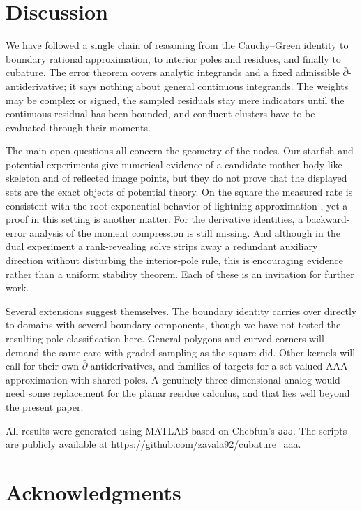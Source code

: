 \documentclass[onefignum,onetabnum]{siamart220329}
\begin{document}
\section{Discussion}
\label{sec:discussion}

We have followed a single chain of reasoning from the Cauchy--Green
identity to boundary rational approximation, to interior poles and
residues, and finally to cubature. The error theorem covers analytic
integrands and a fixed admissible $\bar\partial$-antiderivative; it says
nothing about general continuous integrands. The weights may be complex
or signed, the sampled residuals stay mere indicators until the
continuous residual has been bounded, and confluent clusters have to be
evaluated through their moments.

The main open questions all concern the geometry of the nodes. Our
starfish and potential experiments give numerical evidence of a
candidate mother-body-like skeleton and of reflected image points, but
they do not prove that the displayed sets are the exact objects of
potential theory. On the square the measured rate is consistent with
the root-exponential behavior of lightning approximation
\cite{GopalTrefethen2019}, yet a proof in this setting is another
matter. For the derivative identities, a backward-error analysis of the
moment compression is still missing. And although in the dual
experiment a rank-revealing solve strips away a redundant auxiliary
direction without disturbing the interior-pole rule, this is encouraging
evidence rather than a uniform stability theorem. Each of these is an
invitation for further work.

Several extensions suggest themselves. The boundary identity carries
over directly to domains with several boundary components, though we
have not tested the resulting pole classification here. General
polygons and curved corners will demand the same care with graded
sampling as the square did. Other kernels will call for their own
$\bar\partial$-antiderivatives, and families of targets for a
set-valued AAA approximation with shared poles. A genuinely
three-dimensional analog would need some replacement for the planar
residue calculus, and that lies well beyond the present paper.

All results were generated using MATLAB based on Chebfun's \texttt{aaa}. The scripts are publicly available at \url{https://github.com/zavala92/cubature_aaa}.

\section*{Acknowledgments}
\end{document}
